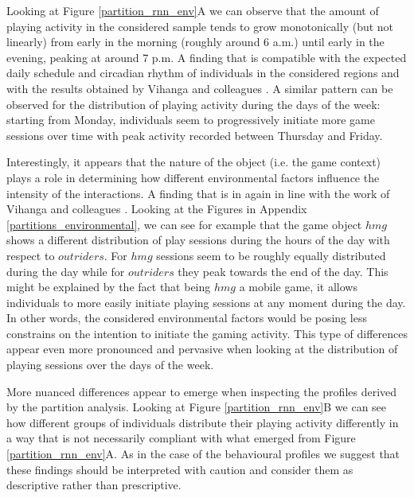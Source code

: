 Looking at Figure \ref{partition_rnn_env}A we can observe that the amount of playing activity in the considered sample tends to grow monotonically (but not linearly) from early in the morning (roughly around 6 a.m.) until early in the evening, peaking at around 7 p.m. A finding that is compatible with the expected daily schedule and circadian rhythm of individuals in the considered regions \cite{vitaterna2001overview} and with the results obtained by Vihanga and colleagues \cite{vihanga2019weekly}. A similar pattern can be observed for the distribution of playing activity during the days of the week: starting from Monday, individuals seem to progressively initiate more game sessions over time with peak activity recorded between Thursday and Friday. 

Interestingly, it appears that the nature of the object (i.e. the game context) plays a role in determining how different environmental factors influence the intensity of the interactions. A finding that is in again in line with the work of Vihanga and colleagues \cite{vihanga2019weekly, wannigamage2021player}. Looking at the Figures in Appendix \ref{partitions_environmental}, we can see for example that the game object $hmg$ shows a different distribution of play sessions during the hours of the day with respect to $outriders$. For $hmg$ sessions seem to be roughly equally distributed during the day while for $outriders$ they peak towards the end of the day. This might be explained by the fact that being $hmg$ a mobile game, it allows individuals to  more easily initiate playing sessions at any moment during the day. In other words, the considered environmental factors would be posing less constrains on the intention to initiate the gaming activity. This type of differences appear even more pronounced and pervasive when looking at the distribution of playing sessions over the days of the week. 

More nuanced differences appear to emerge when inspecting the profiles derived by the partition analysis. Looking at Figure \ref{partition_rnn_env}B we can see how different groups of individuals distribute their playing activity differently in a way that is not necessarily compliant with what emerged from Figure \ref{partition_rnn_env}A. As in the case of the behavioural profiles we suggest that   these findings should be interpreted with caution and consider them as descriptive rather than prescriptive. 


